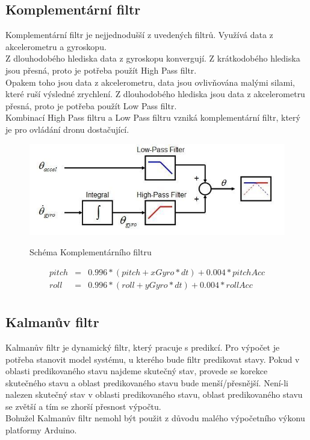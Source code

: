 \subsection{Komplementární filtr}
Komplementární filtr je nejjednodušší z uvedených filtrů. Využívá data z akcelerometru a gyroskopu. \\
Z dlouhodobého hlediska data z gyroskopu konvergují. Z krátkodobého hlediska jsou přesná, proto je potřeba použít High Pass filtr.\\
Opakem toho jsou data z akcelerometru, data jsou ovlivňována malými silami, které ruší výsledné zrychlení. Z dlouhodobého hlediska jsou data z akcelerometru přesná, proto je potřeba použít Low Pass filtr.\\
Kombinací High Pass filtru a Low Pass filtru vzniká komplementární filtr, který je pro ovládání dronu dostačující.\\
\begin{figure}[H]
	\centering
	\includegraphics[width=15cm]{pictures/complementary.jpg}
	\caption{Schéma Komplementárního filtru}
	\cite{complementary}
\end{figure}
\begin{eqnarray*} 
	pitch & = & 0.996 * (pitch + xGyro * dt) + 0.004 * pitchAcc\\
	roll & = & 0.996 * (roll + yGyro * dt) + 0.004 * rollAcc\\
\end{eqnarray*}


\subsection{Kalmanův filtr}
Kalmanův filtr je dynamický filtr, který pracuje s predikcí. Pro výpočet je potřeba stanovit model systému, u kterého bude filtr predikovat stavy. Pokud v oblasti predikovaného stavu najdeme skutečný stav, provede se korekce skutečného stavu a oblast predikovaného stavu bude menší/přesnější. Není-li nalezen skutečný stav v oblasti predikovaného stavu, oblast predikovaného stavu se zvětší a tím se zhorší přesnost výpočtu.\\
Bohužel Kalmanův filtr nemohl být použit z důvodu malého výpočetního výkonu platformy Arduino.

